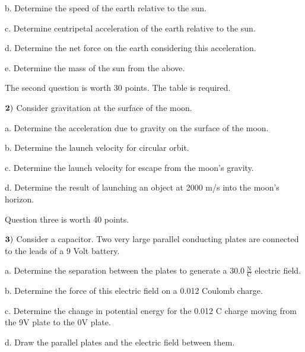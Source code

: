 \documentclass{article}
\begin{document}
 
 b.  Determine the speed of the earth relative to the sun.
 
  \vspace{3.5cm}
  
 c.  Determine centripetal acceleration of the earth relative to the sun.
 
  \vspace{3.5cm}
 
 d. Determine the net force on the earth considering this acceleration.
 
  \vspace{3.5cm}
 
 e. Determine the mass of the sun from the above.
 
  
 
 


  \newpage
  The second question is worth 30 points.  The table is required.
  
 $\bf{2)}$  Consider gravitation at the surface of the moon.
 
 \vspace{1cm}

  
 a.  Determine the acceleration due to gravity on the surface of the moon.
   \vspace{4.5cm}
 
 b.  Determine the launch velocity for circular orbit.
   \vspace{4.5cm}
 
 c.  Determine the launch velocity for escape from the moon's gravity.
   \vspace{4.5cm}
 
 d.  Determine the result of launching an object at 2000 m/s into the moon's horizon.
 

  \newpage

Question three is worth 40 points.

  $\bf{3)}$  Consider a capacitor.  Two very large parallel conducting plates are connected to the leads of a 9 Volt battery.
  \vspace{0.5cm}
  
  a.  Determine the separation between the plates to generate a $30.0\  \frac{\text{N}}{\text{C}}$ electric field.
    \vspace{4.5cm}
  
  b.  Determine the force of this electric field on a 0.012 Coulomb charge.
    \vspace{4.5cm}
  
  c.  Determine the change in potential energy for the 0.012 C charge moving from the 9V plate to the 0V plate.
    \vspace{4.5cm}
  
  d. Draw the parallel plates and the electric field between them.  
  
  
 
\end{document}
